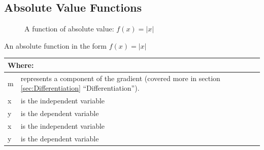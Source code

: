 \subsection{Absolute Value Functions}
\begin{figure}[!hbt]
\label{fig:FuncGraphAbsolute}
\caption{A function of absolute value: $f(x) = |x|$}
\end{figure}
An absolute function in the form $ f(x) = |x|$
\begin{table}[!hbt]
\label{tab:PartsOfAnAbsoluteFunction}
\begin{tabularx}{\linewidth}{| l X |}
  \hline
  \multicolumn{2}{|l|}{Where:} \\
  \hline \hline
  m & represents a component of the gradient (covered more in section
  \ref{sec:Differentiation} ``Differentiation''). \\ x & is the independent
  variable\\ y & is the dependent variable\\
  x & is the independent variable\\
  y & is the dependent variable\\
\hline
\end{tabularx}
\end{table}
\clearpage
%

